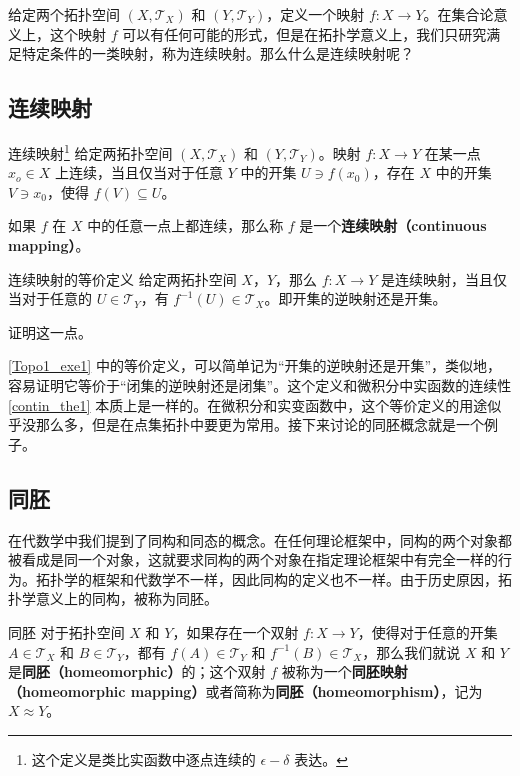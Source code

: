 

给定两个拓扑空间 $(X, \mathcal{T}_X)$ 和 $(Y, \mathcal{T}_Y)$，定义一个映射 $f:X\rightarrow Y$。在集合论意义上，这个映射 $f$ 可以有任何可能的形式，但是在拓扑学意义上，我们只研究满足特定条件的一类映射，称为连续映射。那么什么是连续映射呢？

\subsection{连续映射}
\begin{definition}{连续映射\footnote{这个定义是类比实函数中逐点连续的 $\epsilon-\delta$ 表达。}}
给定两拓扑空间 $(X, \mathcal{T}_X)$ 和 $(Y, \mathcal{T}_Y)$。映射 $f:X\rightarrow Y$ 在某一点 $x_o\in X$ 上连续，当且仅当对于任意 $Y$ 中的开集 $U\ni f(x_0)$，存在 $X$ 中的开集 $V\ni x_0$，使得 $f(V)\subseteq U$。

如果 $f$ 在 $X$ 中的任意一点上都连续，那么称 $f$ 是一个\textbf{连续映射（continuous mapping）}。
\end{definition}

\begin{exercise}{连续映射的等价定义}\label{Topo1_exe1}
给定两拓扑空间 $X$，$Y$，那么 $f:X\rightarrow Y$ 是连续映射，当且仅当对于任意的 $U\in\mathcal{T}_Y$，有 $f^{-1}(U)\in\mathcal{T}_X$。即开集的逆映射还是开集。

证明这一点。
\end{exercise}

\autoref{Topo1_exe1} 中的等价定义，可以简单记为“开集的逆映射还是开集”，类似地，容易证明它等价于“闭集的逆映射还是闭集”。这个定义和微积分中实函数的连续性\autoref{contin_the1} 本质上是一样的。在微积分和实变函数中，这个等价定义的用途似乎没那么多，但是在点集拓扑中要更为常用。接下来讨论的同胚概念就是一个例子。

\subsection{同胚}

在代数学中我们提到了同构和同态的概念。在任何理论框架中，同构的两个对象都被看成是同一个对象，这就要求同构的两个对象在指定理论框架中有完全一样的行为。拓扑学的框架和代数学不一样，因此同构的定义也不一样。由于历史原因，拓扑学意义上的同构，被称为同胚。

\begin{definition}{同胚}
对于拓扑空间 $X$ 和 $Y$，如果存在一个双射 $f:X\rightarrow Y$，使得对于任意的开集 $A\in\mathcal{T}_X$ 和 $B\in\mathcal{T}_Y$，都有 $f(A)\in\mathcal{T}_Y$ 和 $f^{-1}(B)\in\mathcal{T}_X$，那么我们就说 $X$ 和 $Y$ 是\textbf{同胚（homeomorphic）}的；这个双射 $f$ 被称为一个\textbf{同胚映射（homeomorphic mapping）}或者简称为\textbf{同胚（homeomorphism）}，记为 $X\approx Y$。
\end{definition}

